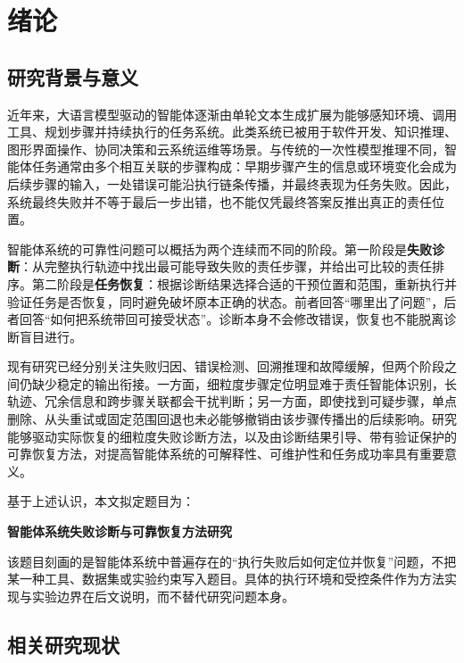 
\chapter{绪论}\label{chap1}

\section{研究背景与意义}

近年来，大语言模型驱动的智能体逐渐由单轮文本生成扩展为能够感知环境、调用工具、规划步骤并持续执行的任务系统。此类系统已被用于软件开发、知识推理、图形界面操作、协同决策和云系统运维等场景。与传统的一次性模型推理不同，智能体任务通常由多个相互关联的步骤构成：早期步骤产生的信息或环境变化会成为后续步骤的输入，一处错误可能沿执行链条传播，并最终表现为任务失败。因此，系统最终失败并不等于最后一步出错，也不能仅凭最终答案反推出真正的责任位置。

智能体系统的可靠性问题可以概括为两个连续而不同的阶段。第一阶段是\textbf{失败诊断}：从完整执行轨迹中找出最可能导致失败的责任步骤，并给出可比较的责任排序。第二阶段是\textbf{任务恢复}：根据诊断结果选择合适的干预位置和范围，重新执行并验证任务是否恢复，同时避免破坏原本正确的状态。前者回答“哪里出了问题”，后者回答“如何把系统带回可接受状态”。诊断本身不会修改错误，恢复也不能脱离诊断盲目进行。

现有研究已经分别关注失败归因、错误检测、回溯推理和故障缓解，但两个阶段之间仍缺少稳定的输出衔接。一方面，细粒度步骤定位明显难于责任智能体识别，长轨迹、冗余信息和跨步骤关联都会干扰判断；另一方面，即使找到可疑步骤，单点删除、从头重试或固定范围回退也未必能够撤销由该步骤传播出的后续影响。研究能够驱动实际恢复的细粒度失败诊断方法，以及由诊断结果引导、带有验证保护的可靠恢复方法，对提高智能体系统的可解释性、可维护性和任务成功率具有重要意义。

基于上述认识，本文拟定题目为：

\begin{center}
  \textbf{智能体系统失败诊断与可靠恢复方法研究}
\end{center}

该题目刻画的是智能体系统中普遍存在的“执行失败后如何定位并恢复”问题，不把某一种工具、数据集或实验约束写入题目。具体的执行环境和受控条件作为方法实现与实验边界在后文说明，而不替代研究问题本身。

\section{相关研究现状}

